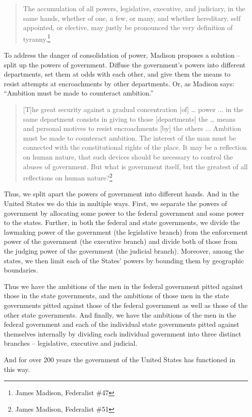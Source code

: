 \begin{quote}
The accumulation of all powers, legislative, executive, and judiciary, in the same hands, whether of one, a few, or many, and whether hereditary, self appointed, or elective, may justly be pronounced the very definition of tyranny.\footnote{James Madison, Federalist \#47}
\end{quote}

To address the danger of consolidation of power, Madison proposes a solution -- split up the powers of government.  Diffuse the government's powers into different departments, set them at odds with each other, and give them the means to resist attempts at encroachments by other departments.  Or, as Madison says: ``Ambition must be made to counteract ambition.''

\begin{quote}
[T]he great security against a gradual concentration [of] … power ... in the same department consists in giving to those [departments] the … means and personal motives to resist encroachments [by] the others ... Ambition must be made to counteract ambition. The interest of the man must be connected with the constitutional rights of the place. It may be a reflection on human nature, that such devices should be necessary to control the abuses of government. But what is government itself, but the greatest of all reflections on human nature?\footnote{James Madison, Federalist \#51}
\end{quote}

Thus, we split apart the powers of government into different hands.  And in the United States we do this in multiple ways.  First, we separate the powers of government by allocating some power to the federal government and some power to the states.  Further, in both the federal and state governments, we divide the lawmaking power of the government (the legislative branch) from the enforcement power of the government (the executive branch) and divide both of those from the judging power of the government (the judicial branch).  Moreover, among the states, we then limit each of the States' powers by bounding them by geographic boundaries.

Thus we have the ambitions of the men in the federal government pitted against those in the state governments, and the ambitions of those men in the state governments pitted against those of the federal government as well as those of the other state governments.  And finally, we have the ambitions of the men in the federal government and each of the individual state governments pitted against themselves internally by dividing each individual government into three distinct branches -- legislative, executive and judicial.

And for over 200 years the government of the United States has functioned in this way.